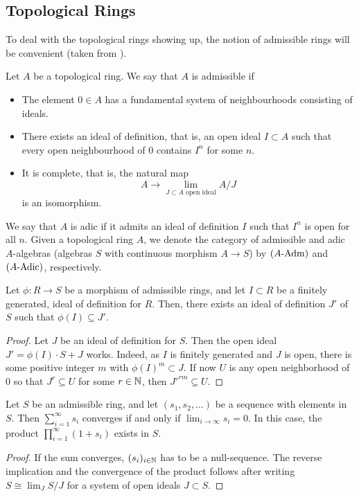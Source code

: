 \documentclass[../main.tex]{subfiles}
\begin{document}
\subsection{Topological Rings}
To deal with the topological rings showing up, the notion of admissible rings
will be convenient (taken from \cite[Tag 07E8]{stacks-project}).
\begin{defi}\label{def:admring}
  Let $A$ be a topological ring. We say that $A$ is admissible if
  \begin{itemize}
    \item The element $0 \in A$ has a fundamental system of neighbourhoods
      consisting of ideals.
    \item There exists an ideal of definition, that is, an open ideal $I
      \subset A$ such that every open neighbourhood of $0$ contains $I^n$ for
      some $n$.
    \item It is complete, that is, the natural map
      \begin{equation*}
        A \to \lim_{J \subset A \text{ open ideal}} A/J
      \end{equation*}
      is an isomorphism.
  \end{itemize}
  We say that $A$ is adic if it admits an ideal of definition $I$ such that 
  $I^n$ is open for all $n$.
  Given a topological ring $A$, we denote the category of admissible 
  and adic $A$-algebras (algebras $S$ with continuous morphism $A \to S$) by
  ${({A}\text-\allowbreak\mathrm{Adm})}$ and ${({A}\text-\allowbreak\mathrm{Adic})}$, respectively.
\end{defi}


\begin{lem} \label{lem:iodimage}
  Let $\phi: R \to S$ be a morphism of admissible rings, and let $I \subset R$ be a finitely generated, ideal of definition for 
  $R$. Then, there exists an ideal of definition $J'$ of $S$ such that 
  $\phi(I) \subseteq J'$.
\begin{proof}
  Let $J$ be an ideal of definition for $S$. Then the open
  ideal $J' = \phi(I)\cdot S + J$ works. Indeed, as $I$
  is finitely generated and $J$ is open, there is some positive integer $m$ with $\phi(I)^m \subset J$. If now $U$ is any open neighborhood 
  of $0$ so that $J^r \subseteq U$ for some $r \in \mathbb{N}$, then $J'^{rm} \subseteq U$. 
\end{proof}
\end{lem}

\begin{lem}\label{lem:infiniteseriesandproducts}
  Let $S$ be an admissible ring, and let $(s_1, s_2, \dots)$ be a sequence with
  elements in $S$. Then $\sum_{i = 1}^\infty s_i$ converges if and only if 
   $\lim_{i \to \infty} s_i = 0$. In this case, the product $\prod_{i=1}^\infty (1 + s_i)$
   exists in $S$.
\begin{proof}
  If the sum converges, $(s_i)_{i \in \mathbb{N}}$ has to be a null-sequence. The
  reverse implication and the convergence of the product follows after writing
  $S \cong \lim_{J} S/J$ for a system of open ideals $J \subset S$. 
\end{proof}
\end{lem}
\end{document}
